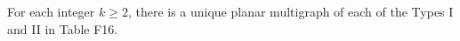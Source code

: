 For each integer $k \geq 2$, there is a unique planar multigraph of each of the Types I and II in Table F16.
